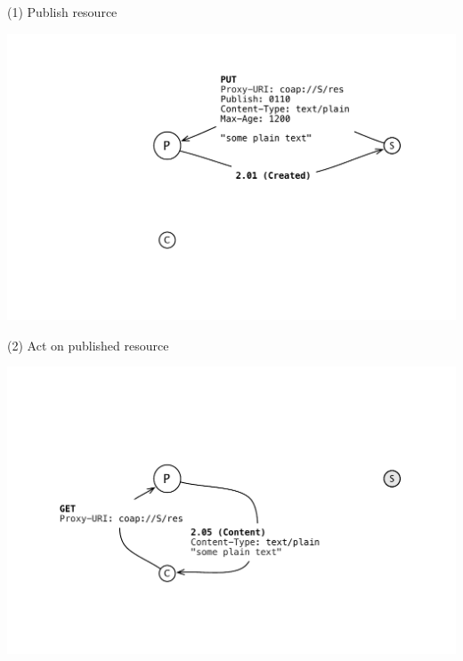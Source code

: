 \documentclass{beamer}
\begin{document}
\begin{frame}{(1) Publish resource}
 \begin{center}
  \includegraphics[width=\textwidth]{../../share/images/publish0.pdf}
 \end{center}
\end{frame}

\begin{frame}{(2) Act on published resource}
 \begin{center}
  \includegraphics[width=\textwidth]{../../share/images/publish1.pdf}
 \end{center}
\end{frame}
\end{document}

